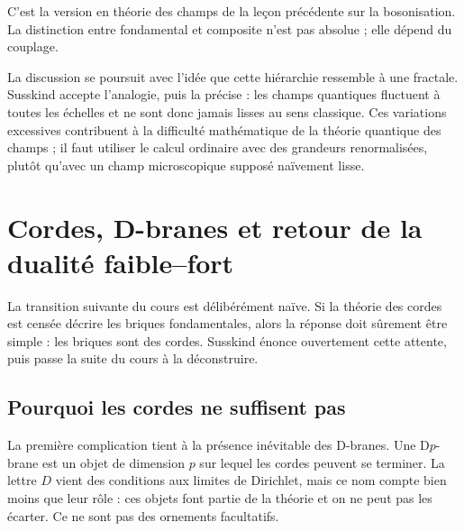C’est la version en théorie des champs de la leçon précédente sur la bosonisation. La distinction entre fondamental et composite n’est pas absolue ; elle dépend du couplage.

\begin{classroomqa}
\end{classroomqa}

La discussion se poursuit avec l’idée que cette hiérarchie ressemble à une fractale. Susskind accepte l’analogie, puis la précise : les champs quantiques fluctuent à toutes les échelles et ne sont donc jamais lisses au sens classique. Ces variations excessives contribuent à la difficulté mathématique de la théorie quantique des champs ; il faut utiliser le calcul ordinaire avec des grandeurs renormalisées, plutôt qu’avec un champ microscopique supposé naïvement lisse.

\section{Cordes, D-branes et retour de la dualité faible--fort}

La transition suivante du cours est délibérément naïve. Si la théorie des cordes est censée décrire les briques fondamentales, alors la réponse doit sûrement être simple : les briques sont des cordes. Susskind énonce ouvertement cette attente, puis passe la suite du cours à la déconstruire.

\subsection{Pourquoi les cordes ne suffisent pas}

La première complication tient à la présence inévitable des D-branes. Une D\(p\)-brane est un objet de dimension \(p\) sur lequel les cordes peuvent se terminer. La lettre \(D\) vient des conditions aux limites de Dirichlet, mais ce nom compte bien moins que leur rôle : ces objets font partie de la théorie et on ne peut pas les écarter. Ce ne sont pas des ornements facultatifs.

